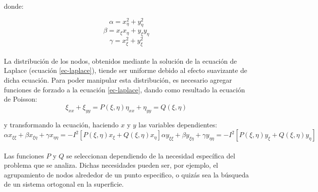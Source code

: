 \documentclass[letterpaper, openright, 12pt]{book}
\begin{document}
				donde:
				
				\begin{equation*}
					\alpha = x_{\eta} ^ 2 + y_{\eta}^2
				\end{equation*}
				\begin{equation*}
					\beta = x_{\xi} x_{\eta} + y_{\xi} y_{\eta}
				\end{equation*}
				\begin{equation*}
					\gamma = x_{\xi} ^ 2 + y_{\xi} ^ 2
				\end{equation*}
			
			\paragraph*{}
				La distribución de los nodos, obtenidos mediante la solución de la ecuación de Laplace (ecuación \ref{ec-laplace}),  tiende ser uniforme debido al efecto suavizante de dicha ecuación. Para poder manipular esta distribución, es necesario agregar funciones de forzado a la ecuación \ref{ec-laplace}, dando como resultado la ecuación de Poisson:
				\begin{subequations}
					\begin{equation}
						\xi_{xx} + \xi_{yy} = P(\xi, \eta)
					\end{equation}
					\begin{equation}
						\eta_{xx} + \eta_{yy} = Q(\xi, \eta)
					\end{equation}
					\label{ec-poisson}
				\end{subequations}
			
					y transformando la ecuación, haciendo $x$ y $y$  las variables dependientes:
					\begin{subequations}
						\begin{equation}
							\alpha x_{\xi \xi} + \beta x_{\xi \eta} + \gamma x_{\eta \eta} = -I^2 [P(\xi, \eta) x_{\xi} + Q(\xi, \eta) x_{\eta}]
						\end{equation}
						\begin{equation}
						\alpha y_{\xi \xi} + \beta y_{\xi \eta} + \gamma y_{\eta \eta} = -I^2 [P(\xi, \eta) y_{\xi} + Q(\xi, \eta) y_{\eta}]
						\end{equation}
						\label{ec-poisson-invertida}
					\end{subequations}
			
			\paragraph*{}
				Las funciones $P$ y $Q$ se seleccionan dependiendo de la necesidad específica del problema que se analiza. Dichas necesidades pueden ser, por ejemplo, el agrupamiento de nodos alrededor de un punto especifico, o quizás sea la búsqueda de un sistema ortogonal en la superficie.
			
\end{document}
